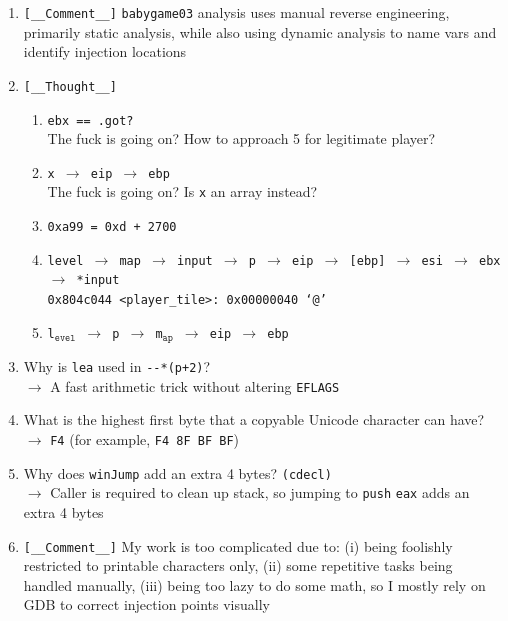 \documentclass[main.tex]{subfiles}
\begin{document}
\begin{minipage}[t]{0.49\textwidth}
	\setlength{\parskip}{1em}
	\begin{enumerate}
		\item[\texttt{[\_]}] \texttt{[\_\_Comment\_\_]} \texttt{babygame03} analysis uses manual reverse engineering, primarily static analysis, while also using dynamic analysis to name vars and identify injection locations
		\item[] \texttt{[\_\_Thought\_\_]}
		\setlength{\parskip}{0.1em}
		\begin{enumerate}[leftmargin=0pt, labelindent=0pt]
			\item[\texttt{[0]}]	\texttt{ebx == .got?}\\
			The fuck is going on? How to approach 5 for legitimate player?
			\item[\texttt{[2]}] \texttt{x $\rightarrow$ eip $\rightarrow$ ebp}\\
			The fuck is going on? Is \texttt{x} an array instead?
			\item[\texttt{[3]}] \texttt{0xa99 = 0xd + 2700}
			\item[\texttt{[5]}] \texttt{level $\rightarrow$ map $\rightarrow$ input $\rightarrow$ p $\rightarrow$ eip $\rightarrow$ [ebp] $\rightarrow$ esi $\rightarrow$ ebx $\rightarrow$ *input} \\
			\texttt{0x804c044 <player\_tile>: 0x00000040 `@'}
			\item[\texttt{[6]}] \texttt{l$_{\texttt{evel}}$ $\rightarrow$ p $\rightarrow$ m$_{\texttt{ap}}$ $\rightarrow$ eip $\rightarrow$ ebp}
		\end{enumerate}
		\setlength{\parskip}{1em}
		\item[\texttt{[5]}] Why is \texttt{lea} used in \texttt{-{-}*(p+2)}?\\
		$\rightarrow$ A fast arithmetic trick without altering \texttt{EFLAGS}
		\item[\texttt{[8]}] What is the highest first byte that a copyable Unicode character can have?\\
		$\rightarrow$ \texttt{F4} (for example, \texttt{F4 8F BF BF})
		\item[\texttt{[9]}] Why does \texttt{winJump} add an extra 4 bytes? \texttt{(cdecl)}\\
		$\rightarrow$ Caller is required to clean up stack, so jumping to \texttt{push} \texttt{eax} adds an extra 4 bytes
		\item[\texttt{[\_]}] \texttt{[\_\_Comment\_\_]} My work is too complicated due to: (i) being foolishly restricted to printable characters only, (ii) some repetitive tasks being handled manually, (iii) being too lazy to do some math, so I mostly rely on GDB to correct injection points visually
	\end{enumerate}
\end{minipage}
\end{document}
